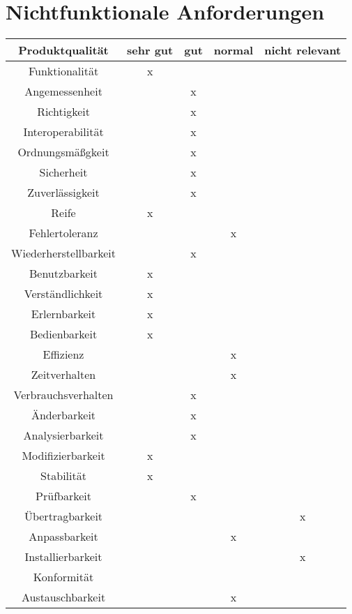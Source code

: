 
\chapter{Nichtfunktionale Anforderungen}


\begin{tabular}{|c|c|c|c|c|}
  \hline                                              %

  \textbf{Produktqualität}  & \textbf{sehr gut}  &    \textbf{gut}  &
  \textbf{normal}           & \textbf{nicht relevant}  \\  %
  \hline                                              %

Funktionalität  &x&&&\\        %
  \hline
Angemessenheit&&x&&\\
\hline
Richtigkeit&&x&&\\
\hline
Interoperabilität&&x&&\\
\hline
Ordnungsmäßgkeit&&x&&\\
\hline
Sicherheit&&x&&\\
\hline
Zuverlässigkeit&&x&&\\
\hline
Reife&x&&&\\
\hline
Fehlertoleranz&&&x&\\
\hline
Wiederherstellbarkeit&&x&&\\
\hline
Benutzbarkeit&x&&&\\
\hline
Verständlichkeit&x&&&\\
\hline
Erlernbarkeit&x&&&\\
\hline
Bedienbarkeit&x&&&\\
\hline
Effizienz&&&x&\\
\hline
Zeitverhalten&&&x&\\
\hline
Verbrauchsverhalten&&x&&\\
\hline
Änderbarkeit&&x&&\\
\hline
Analysierbarkeit&&x&&\\
\hline
Modifizierbarkeit&x&&&\\
\hline
Stabilität&x&&&\\
\hline
Prüfbarkeit&&x&&\\
\hline
Übertragbarkeit&&&&x\\
\hline
Anpassbarkeit&&&x&\\
\hline
Installierbarkeit&&&&x\\
\hline
Konformität&&&&\\
\hline
Austauschbarkeit&&&x&\\
\hline
\end{tabular}


